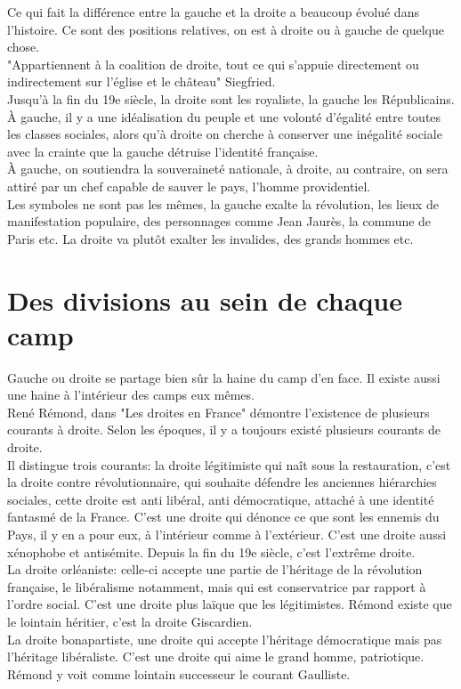 \documentclass[12pt, a4paper, openany]{book}
\begin{document}
Ce qui fait la différence entre la gauche et la droite a beaucoup évolué dans l'histoire. Ce sont des positions relatives, on est à droite ou à gauche de quelque chose. \\
"Appartiennent à la coalition de droite, tout ce qui s'appuie directement ou indirectement sur l'église et le château" Siegfried. \\
Jusqu'à la fin du 19e siècle, la droite sont les royaliste, la gauche les Républicains. \\
À gauche, il y a une idéalisation du peuple et une volonté d'égalité entre toutes les classes sociales, alors qu'à droite on cherche à conserver une inégalité sociale avec la crainte que la gauche détruise l'identité française. \\
À gauche, on soutiendra la souveraineté nationale, à droite, au contraire, on sera attiré par un chef capable de sauver le pays, l'homme providentiel. \\
Les symboles ne sont pas les mêmes, la gauche exalte la révolution, les lieux de manifestation populaire, des personnages comme Jean Jaurès, la commune de Paris etc. La droite va plutôt exalter les invalides, des grands hommes etc.

\section{Des divisions au sein de chaque camp}

Gauche ou droite se partage bien sûr la haine du camp d'en face. Il existe aussi une haine à l'intérieur des camps eux mêmes. \\
René Rémond, dans "Les droites en France" démontre l'existence de plusieurs courants à droite. Selon les époques, il y a toujours existé plusieurs courants de droite. \\
Il distingue trois courants: la droite légitimiste qui naît sous la restauration, c'est la droite contre révolutionnaire, qui souhaite défendre les anciennes hiérarchies sociales, cette droite est anti libéral, anti démocratique, attaché à une identité fantasmé de la France. C'est une droite qui dénonce ce que sont les ennemis du Pays, il y en a pour eux, à l'intérieur comme à l'extérieur. C'est une droite aussi xénophobe et antisémite. Depuis la fin du 19e siècle, c'est l'extrême droite. \\
La droite orléaniste: celle-ci accepte une partie de l'héritage de la révolution française, le libéralisme notamment, mais qui est conservatrice par rapport à l'ordre social. C'est une droite plus laïque que les légitimistes. Rémond existe que le lointain héritier, c'est la droite Giscardien. \\
La droite bonapartiste, une droite qui accepte l'héritage démocratique mais pas l'héritage libéraliste. C'est une droite qui aime le grand homme, patriotique. Rémond y voit comme lointain successeur le courant Gaulliste. 
\end{document}
